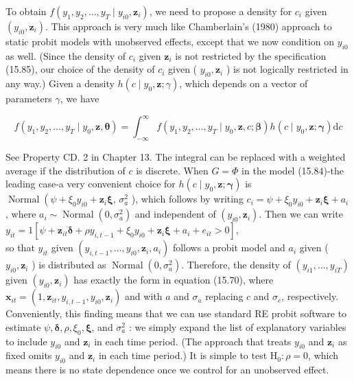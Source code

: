 \documentclass[10pt]{article}
\begin{document}
To obtain $f\left(y_{1}, y_{2}, \ldots, y_{T} \mid y_{i 0}, \mathbf{z}_{i}\right)$, we need to propose a density for $c_{i}$ given $\left(y_{i 0}, \mathbf{z}_{i}\right)$. This approach is very much like Chamberlain's (1980) approach to static probit models with unobserved effects, except that we now condition on $y_{i 0}$ as well. (Since the density of $c_{i}$ given $\mathbf{z}_{i}$ is not restricted by the specification (15.85), our choice of the density of $c_{i}$ given ( $y_{i 0}, \mathbf{z}_{i}$ ) is not logically restricted in any way.) Given a density $h\left(c \mid y_{0}, \mathbf{z} ; \gamma\right)$, which depends on a vector of parameters $\gamma$, we have

$$
f\left(y_{1}, y_{2}, \ldots, y_{T} \mid y_{0}, \mathbf{z}, \boldsymbol{\theta}\right)=\int_{-\infty}^{\infty} f\left(y_{1}, y_{2}, \ldots, y_{T} \mid y_{0}, \mathbf{z}, c ; \boldsymbol{\beta}\right) h\left(c \mid y_{0}, \mathbf{z} ; \boldsymbol{\gamma}\right) \mathrm{d} c
$$

See Property CD. 2 in Chapter 13. The integral can be replaced with a weighted average if the distribution of $c$ is discrete. When $G=\Phi$ in the model (15.84)-the leading case-a very convenient choice for $h\left(c \mid y_{0}, \mathbf{z} ; \boldsymbol{\gamma}\right)$ is $\operatorname{Normal}\left(\psi+\xi_{0} y_{i 0}+\mathbf{z}_{i} \boldsymbol{\xi}\right.$, $\sigma_{a}^{2}$ ), which follows by writing $c_{i}=\psi+\xi_{0} y_{i 0}+\mathbf{z}_{i} \boldsymbol{\xi}+a_{i}$, where $a_{i} \sim \operatorname{Normal}\left(0, \sigma_{a}^{2}\right)$ and independent of $\left(y_{i 0}, \mathbf{z}_{i}\right)$. Then we can write\\
$y_{i t}=1\left[\psi+\mathbf{z}_{i t} \boldsymbol{\delta}+\rho y_{i, t-1}+\xi_{0} y_{i 0}+\mathbf{z}_{i} \boldsymbol{\xi}+a_{i}+e_{i t}>0\right]$,\\
so that $y_{i t}$ given $\left(y_{i, t-1}, \ldots, y_{i 0}, \mathbf{z}_{i}, a_{i}\right)$ follows a probit model and $a_{i}$ given ( $y_{i 0}, \mathbf{z}_{i}$ ) is distributed as $\operatorname{Normal}\left(0, \sigma_{a}^{2}\right)$. Therefore, the density of $\left(y_{i 1}, \ldots, y_{i T}\right)$ given $\left(y_{i 0}, \mathbf{z}_{i}\right)$ has exactly the form in equation (15.70), where $\mathbf{x}_{i t}=\left(1, \mathbf{z}_{i t}, y_{i, t-1}, y_{i 0}, \mathbf{z}_{i}\right)$ and with $a$ and $\sigma_{a}$ replacing $c$ and $\sigma_{c}$, respectively. Conveniently, this finding means that we can use standard RE probit software to estimate $\psi, \boldsymbol{\delta}, \rho, \xi_{0}, \boldsymbol{\xi}$, and $\sigma_{a}^{2}$ : we simply expand the list of explanatory variables to include $y_{i 0}$ and $\mathbf{z}_{i}$ in each time period. (The approach that treats $y_{i 0}$ and $\mathbf{z}_{i}$ as fixed omits $y_{i 0}$ and $\mathbf{z}_{i}$ in each time period.) It is simple to test $\mathrm{H}_{0}: \rho=0$, which means there is no state dependence once we control for an unobserved effect.
\end{document}
